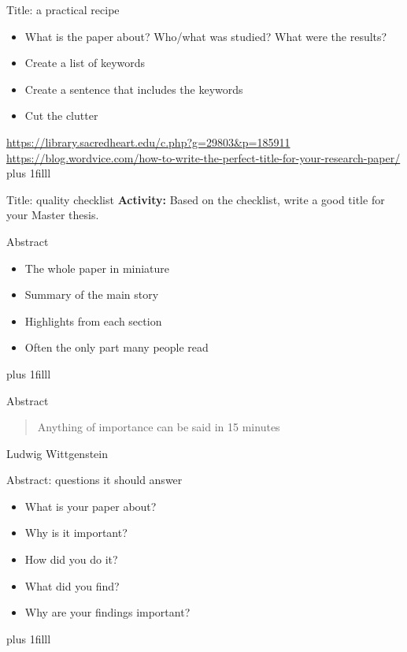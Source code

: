 \documentclass[aspectratio=169]{beamer}
\newcommand{\btVFill}{\vskip0pt plus 1filll}
\newcommand{\Activity}[1]{\textbf{Activity:} #1}
\begin{document}
\begin{frame}{Title: a practical recipe}
  \begin{itemize}
    \item What is the paper about? Who/what was studied? What were the results?
    \item Create a list of keywords
    \item Create a sentence that includes the keywords
    \item Cut the clutter
  \end{itemize}\bigskip
\url{https://library.sacredheart.edu/c.php?g=29803&p=185911 }
\\
\url{https://blog.wordvice.com/how-to-write-the-perfect-title-for-your-research-paper/} 
\btVFill
\end{frame}

\begin{frame}{Title: quality checklist}
  \Activity{Based on the checklist, write a good title for your Master thesis.}
\end{frame}

\begin{frame}{Abstract}
  \begin{itemize}
    \item The whole paper in miniature
    \item Summary of the main story
    \item Highlights from each section
    \item Often the only part many people read
  \end{itemize}
  \btVFill
\end{frame}

\begin{frame}{Abstract}
\begin{quotation}
  Anything of importance can be said in 15 minutes
\end{quotation}
Ludwig Wittgenstein
\end{frame}
\begin{frame}{Abstract: questions it should answer}
  \begin{itemize}
    \item What is your paper about?
    \item Why is it important?
    \item How did you do it?
    \item What did you find?
    \item Why are your findings important?
  \end{itemize}
  \btVFill
\end{frame}
\end{document}
